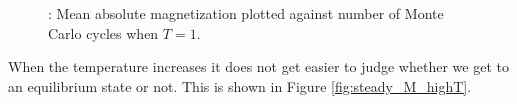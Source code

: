 \documentclass{article}
\begin{document}
{		\begin{figure}[H]
		\caption{: Mean absolute magnetization plotted against number of Monte Carlo cycles when $T = 1$. }
		\label{fig:steady_M}
		\end{figure}

		When the temperature increases it does not get easier to judge whether we get to an equilibrium state or not. This is shown in Figure \ref{fig:steady_M_highT}.

}
\end{document}
